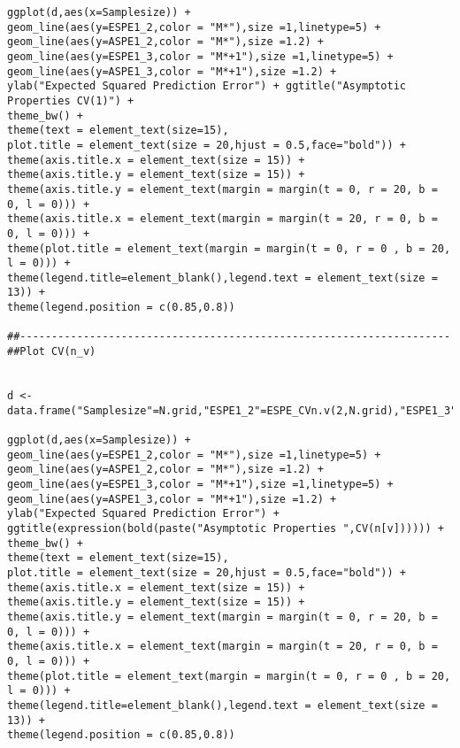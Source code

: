 \documentclass[Research_Module_ES.tex]{subfiles}
\begin{document}
\begin{lstlisting}[title={Simulation Graphic Ilustration ESPE CV1 and CV($n_\nu$)}]
ggplot(d,aes(x=Samplesize)) +
geom_line(aes(y=ESPE1_2,color = "M*"),size =1,linetype=5) +
geom_line(aes(y=ASPE1_2,color = "M*"),size =1.2) +
geom_line(aes(y=ESPE1_3,color = "M*+1"),size =1,linetype=5) +
geom_line(aes(y=ASPE1_3,color = "M*+1"),size =1.2) +
ylab("Expected Squared Prediction Error") + ggtitle("Asymptotic Properties CV(1)") +
theme_bw() +
theme(text = element_text(size=15),
plot.title = element_text(size = 20,hjust = 0.5,face="bold")) +
theme(axis.title.x = element_text(size = 15)) +
theme(axis.title.y = element_text(size = 15)) +
theme(axis.title.y = element_text(margin = margin(t = 0, r = 20, b = 0, l = 0))) +
theme(axis.title.x = element_text(margin = margin(t = 20, r = 0, b = 0, l = 0))) +
theme(plot.title = element_text(margin = margin(t = 0, r = 0 , b = 20, l = 0))) +
theme(legend.title=element_blank(),legend.text = element_text(size = 13)) +
theme(legend.position = c(0.85,0.8))

##--------------------------------------------------------------------
##Plot CV(n_v)


d <- data.frame("Samplesize"=N.grid,"ESPE1_2"=ESPE_CVn.v(2,N.grid),"ESPE1_3"=ESPE_CVn.v(3,N.grid),"ASPE1_2"=MCCV1_d2,"ASPE1_3"=MCCV1_d3)

ggplot(d,aes(x=Samplesize)) +
geom_line(aes(y=ESPE1_2,color = "M*"),size =1,linetype=5) +
geom_line(aes(y=ASPE1_2,color = "M*"),size =1.2) +
geom_line(aes(y=ESPE1_3,color = "M*+1"),size =1,linetype=5) +
geom_line(aes(y=ASPE1_3,color = "M*+1"),size =1.2) +
ylab("Expected Squared Prediction Error") + ggtitle(expression(bold(paste("Asymptotic Properties ",CV(n[v]))))) +
theme_bw() +
theme(text = element_text(size=15),
plot.title = element_text(size = 20,hjust = 0.5,face="bold")) +
theme(axis.title.x = element_text(size = 15)) +
theme(axis.title.y = element_text(size = 15)) +
theme(axis.title.y = element_text(margin = margin(t = 0, r = 20, b = 0, l = 0))) +
theme(axis.title.x = element_text(margin = margin(t = 20, r = 0, b = 0, l = 0))) +
theme(plot.title = element_text(margin = margin(t = 0, r = 0 , b = 20, l = 0))) +
theme(legend.title=element_blank(),legend.text = element_text(size = 13)) +
theme(legend.position = c(0.85,0.8))
\end{lstlisting}
\end{document}
